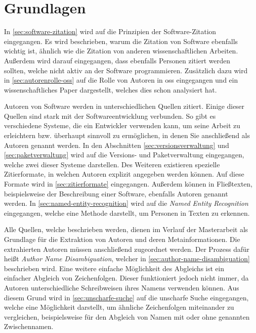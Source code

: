 \chapter{Grundlagen}
\label{chap:grundlagen}
In \autoref{sec:software-zitation} wird auf die Prinzipien der Software-Zitation eingegangen.
Es wird beschrieben, warum die Zitation von Software ebenfalls wichtig ist, ähnlich wie die Zitation von anderen wissenschaftlichen Arbeiten.
Außerdem wird darauf eingegangen, dass ebenfalls Personen zitiert werden sollten, welche nicht aktiv an der Software programmieren.
Zusätzlich dazu wird in \autoref{sec:autorenrolle-oss} auf die Rolle von Autoren in \gls{oss} eingegangen und ein wissenschaftliches Paper dargestellt, welches dies schon analysiert hat.

Autoren von Software werden in unterschiedlichen Quellen zitiert.
Einige dieser Quellen sind stark mit der Softwareentwicklung verbunden.
So gibt es verschiedene Systeme, die ein Entwickler verwenden kann, um seine Arbeit zu erleichtern bzw. überhaupt sinnvoll zu ermöglichen, in denen Sie anschließend als Autoren genannt werden.
In den Abschnitten \ref{sec:versionsverwaltung} und \ref{sec:paketverwaltung} wird auf die Versions- und Paketverwaltung eingegangen, welche zwei dieser Systeme darstellen.
Des Weiteren existieren spezielle Zitierformate, in welchen Autoren explizit angegeben werden können.
Auf diese Formate wird in \autoref{sec:zitierformate} eingegangen.
Außerdem können in Fließtexten, beispielsweise der Beschreibung einer Software, ebenfalls Autoren genannt werden.
In \autoref{sec:named-entity-recognition} wird auf die \emph{Named Entity Recognition} eingegangen, welche eine Methode darstellt, um Personen in Texten zu erkennen.

Alle Quellen, welche beschrieben werden, dienen im Verlauf der Masterarbeit als Grundlage für die Extraktion von Autoren und deren Metainformationen.
Die extrahierten Autoren müssen anschließend zugeordnet werden.
Der Prozess dafür heißt \emph{Author Name Disambiguation}, welcher in \autoref{sec:author-name-disambiguation} beschrieben wird.
Eine weitere einfache Möglichkeit des Abgleichs ist ein einfacher Abgleich von Zeichenfolgen.
Dieser funktioniert jedoch nicht immer, da Autoren unterschiedliche Schreibweisen ihres Namens verwenden können.
Aus diesem Grund wird in \autoref{sec:unscharfe-suche} auf die unscharfe Suche eingegangen, welche eine Möglichkeit darstellt, um ähnliche Zeichenfolgen miteinander zu vergleichen, beispielsweise für den Abgleich von Namen mit oder ohne genannten Zwischennamen.








